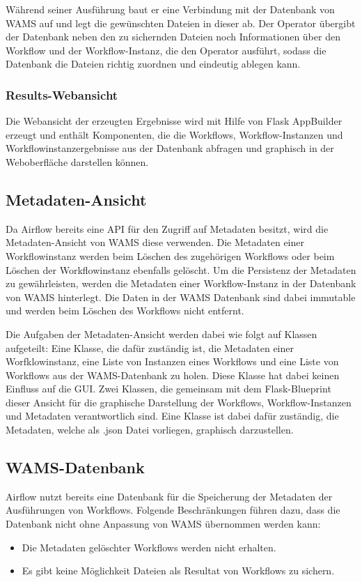 Während seiner Ausführung baut er eine Verbindung mit der Datenbank von WAMS auf und legt die gewünschten Dateien in dieser ab. Der Operator übergibt der Datenbank neben den zu sichernden Dateien noch Informationen über den Workflow und der Workflow-Instanz, die den Operator ausführt, sodass die Datenbank die Dateien richtig zuordnen und eindeutig ablegen kann.


\subsubsection{Results-Webansicht}
Die Webansicht der erzeugten Ergebnisse wird mit Hilfe von Flask \gls{AppBuilder} erzeugt und enthält Komponenten, die die Workflows, Workflow-Instanzen und Workflowinstanzergebnisse aus der Datenbank abfragen und graphisch in der Weboberfläche darstellen können.


\subsection{Metadaten-Ansicht}
Da Airflow bereits eine API für den Zugriff auf Metadaten besitzt, wird die Metadaten-Ansicht von WAMS diese verwenden. 
Die Metadaten einer Workflowinstanz werden beim Löschen des zugehörigen Workflows oder beim Löschen der Workflowinstanz ebenfalls gelöscht. Um die Persistenz der Metadaten zu gewährleisten, werden die Metadaten einer Workflow-Instanz in der Datenbank von WAMS hinterlegt. Die Daten in der WAMS Datenbank sind dabei immutable und werden beim Löschen des Workflows nicht entfernt.

Die Aufgaben der Metadaten-Ansicht werden dabei wie folgt auf Klassen aufgeteilt:
Eine Klasse, die dafür zuständig ist, die Metadaten einer Worfklowinstanz, eine Liste von Instanzen eines Workflows und eine Liste von Workflows aus der WAMS-Datenbank zu holen. Diese Klasse hat dabei keinen Einfluss auf die GUI.
Zwei Klassen, die gemeinsam mit dem Flask-Blueprint dieser Ansicht für die graphische Darstellung der Workflows, Workflow-Instanzen und Metadaten verantwortlich sind. Eine Klasse ist dabei dafür zuständig, die Metadaten, welche als .json Datei vorliegen, graphisch darzustellen.

\subsection{WAMS-Datenbank}
Airflow nutzt bereits eine Datenbank für die Speicherung der Metadaten der Ausführungen von Workflows. Folgende Beschränkungen führen dazu, dass die Datenbank nicht ohne Anpassung von WAMS übernommen werden kann:
\begin{itemize}
    \item Die Metadaten gelöschter Workflows werden nicht erhalten.
    \item Es gibt keine Möglichkeit Dateien als Resultat von Workflows zu sichern.
\end{itemize}

